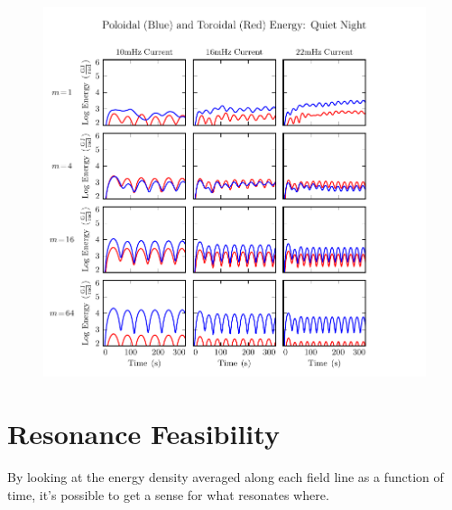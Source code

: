 \begin{figure}[H]
    \centering
    \includegraphics[width=\textwidth]{figures/UP_UT_J_4.pdf}
    \caption[Current-Driven Poloidal and Toroidal Energy: Quiet Night]{}
    \label{fig_UP_UT_J_4}
\end{figure}

\section{Resonance Feasibility}

By looking at the energy density averaged along each field line as a function of time, it's possible to get a sense for what resonates where. 

